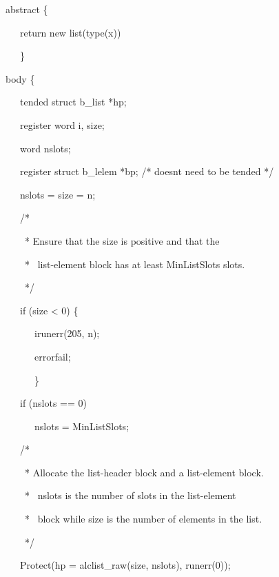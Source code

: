 {\ttfamily\mdseries
\ \ \ abstract \{}

{\ttfamily\mdseries
\ \ \ \ \ \ return new list(type(x))}

{\ttfamily\mdseries
\ \ \ \ \ \ \}}


\bigskip

{\ttfamily\mdseries
\ \ \ body \{}

{\ttfamily\mdseries
\ \ \ \ \ \ tended struct b\_list *hp;}

{\ttfamily\mdseries
\ \ \ \ \ \ register word i, size;}

{\ttfamily\mdseries
\ \ \ \ \ \ word nslots;}

{\ttfamily\mdseries
\ \ \ \ \ \ register struct b\_lelem *bp; /* doesnt need to be tended */}


\bigskip

{\ttfamily\mdseries
\ \ \ \ \ \ nslots = size = n;}


\bigskip

{\ttfamily\mdseries
\ \ \ \ \ \ /*}

{\ttfamily\mdseries
\ \ \ \ \ \ \ * Ensure that the size is positive and that the}

{\ttfamily\mdseries
\ \ \ \ \ \ \ * \ list-element block has at least MinListSlots slots.}

{\ttfamily\mdseries
\ \ \ \ \ \ \ */}

{\ttfamily\mdseries
\ \ \ \ \ \ if (size {\textless} 0) \{}

{\ttfamily\mdseries
\ \ \ \ \ \ \ \ \ irunerr(205, n);}

{\ttfamily\mdseries
\ \ \ \ \ \ \ \ \ errorfail;}

{\ttfamily\mdseries
\ \ \ \ \ \ \ \ \ \}}

{\ttfamily\mdseries
\ \ \ \ \ \ if (nslots == 0)}

{\ttfamily\mdseries
\ \ \ \ \ \ \ \ \ nslots = MinListSlots;}

{\ttfamily\mdseries
\ \ \ \ \ \ /*}

{\ttfamily\mdseries
\ \ \ \ \ \ \ * Allocate the list-header block and a list-element block.}

{\ttfamily\mdseries
\ \ \ \ \ \ \ * \ nslots is the number of slots in the list-element}

{\ttfamily\mdseries
\ \ \ \ \ \ \ * \ block while size is the number of elements in the list.}

{\ttfamily\mdseries
\ \ \ \ \ \ \ */}

{\ttfamily\mdseries
\ \ \ \ \ \ Protect(hp = alclist\_raw(size, nslots), runerr(0));}

